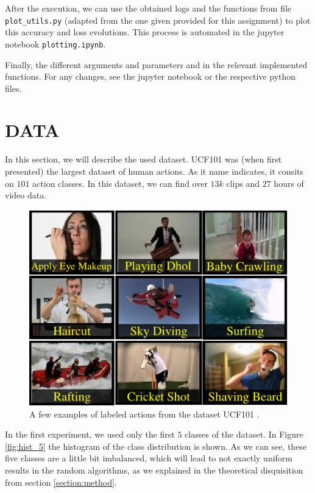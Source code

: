 \documentclass[letterpaper, 10 pt, conference]{ieeeconf}
\begin{document}
After the execution, we can use the obtained logs and the functions from file \texttt{plot_utils.py} (adapted from the one given provided for this assignment) to plot this accuracy and loss evolutions. This process is automated in the jupyter notebook \texttt{plotting.ipynb}.

Finally, the different arguments and parameters and in the relevant implemented functions. For any changes, see the jupyter notebook or the respective python files.


\section{DATA}
\label{section:data}

In this section, we will describe the used dataset. UCF101 \cite{UCF101} was (when first presented) the largest dataset of human actions. As it name indicates, it consits on \(101\) action classes. In this dataset, we can find over \(13k\) clips and \(27\) hours of video data.

\begin{figure}[H]
    \centering
    \includegraphics[scale=0.8]{Figures/first_page_v1.pdf}
    \caption{A few examples of labeled actions from the dataset UCF101 \cite{UCF101}.}
    \label{fig:ucf101}
\end{figure}

In the first experiment, we used only the first \(5\) classes of the dataset.  In Figure \ref{fig:hist_5} the histogram of the class distribution is shown. As we can see, these five classes are a little bit imbalanced, which will lead to not exactly uniform results in the random algorithms, as we explained in the theoretical disquisition from section \ref{section:method}.
\end{document}
